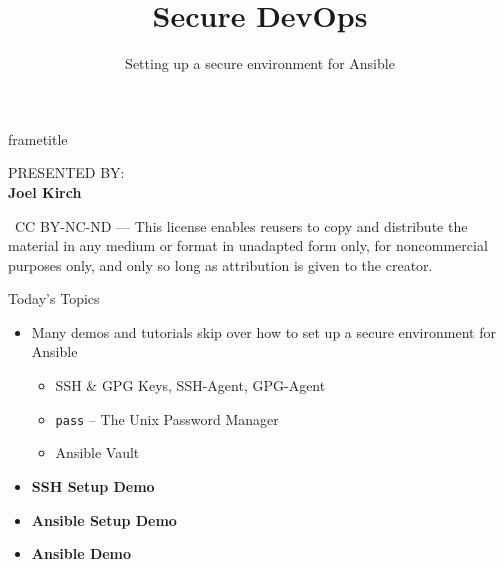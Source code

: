 \documentclass[aspectratio=169,12pt]{beamer}
\title{\Huge Secure DevOps}
\subtitle{\Large Setting up a secure environment for Ansible}
\author{}
\date{}
\begin{document}
\begin{frame}
\vspace{2cm}
\begin{beamercolorbox}[wd=\paperwidth,ht=3cm,dp=1cm]{frametitle}
  \\[0.3cm]
  \hspace{1cm}{\Large Setting up a secure environment for Ansible}
\end{beamercolorbox}
\vfill
\hfill\begin{minipage}{0.3\textwidth}
\raggedleft
{\small PRESENTED BY:}\\
{\Large\textbf{Joel Kirch}}
\end{minipage}\hspace{1cm}
\vspace{0.5cm}

\begin{center}
{\tiny\textcopyright\ CC BY-NC-ND --- This license enables reusers to copy and distribute the material in any medium or format in unadapted form only, for noncommercial purposes only, and only so long as attribution is given to the creator.}
\end{center}
\end{frame}

\begin{frame}{Today's Topics}
\begin{itemize}
  \item Many demos and tutorials skip over how to set up a secure environment for Ansible
  \begin{itemize}
    \item SSH \& GPG Keys, SSH-Agent, GPG-Agent
    \item \texttt{pass} -- The Unix Password Manager
    \item Ansible Vault
  \end{itemize}
  \item \textbf{SSH Setup Demo}
  \item \textbf{Ansible Setup Demo}
  \item \textbf{Ansible Demo}
\end{itemize}
\end{frame}
\end{document}
